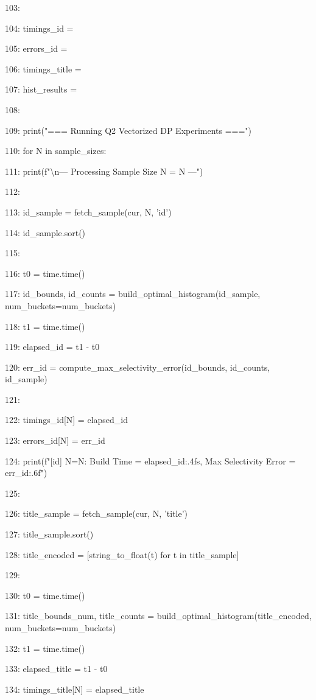 \documentclass[11pt,a4paper]{article}
\begin{document}
103:

104:     timings\_id = {}

105:     errors\_id = {}

106:     timings\_title = {}

107:     hist\_results = {}

108:

109:     print("=== Running Q2 Vectorized DP Experiments ===")

110:     for N in sample\_sizes:

111:         print(f"\textbackslash{}n--- Processing Sample Size N = {N} ---")

112:

113:         id\_sample = fetch\_sample(cur, N, 'id')

114:         id\_sample.sort()

115:

116:         t0 = time.time()

117:         id\_bounds, id\_counts = build\_optimal\_histogram(id\_sample, num\_buckets=num\_buckets)

118:         t1 = time.time()

119:         elapsed\_id = t1 - t0

120:         err\_id = compute\_max\_selectivity\_error(id\_bounds, id\_counts, id\_sample)

121:

122:         timings\_id[N] = elapsed\_id

123:         errors\_id[N] = err\_id

124:         print(f"[id] N={N}: Build Time = {elapsed\_id:.4f}s, Max Selectivity Error = {err\_id:.6f}")

125:

126:         title\_sample = fetch\_sample(cur, N, 'title')

127:         title\_sample.sort()

128:         title\_encoded = [string\_to\_float(t) for t in title\_sample]

129:

130:         t0 = time.time()

131:         title\_bounds\_num, title\_counts = build\_optimal\_histogram(title\_encoded, num\_buckets=num\_buckets)

132:         t1 = time.time()

133:         elapsed\_title = t1 - t0

134:         timings\_title[N] = elapsed\_title
\end{document}
